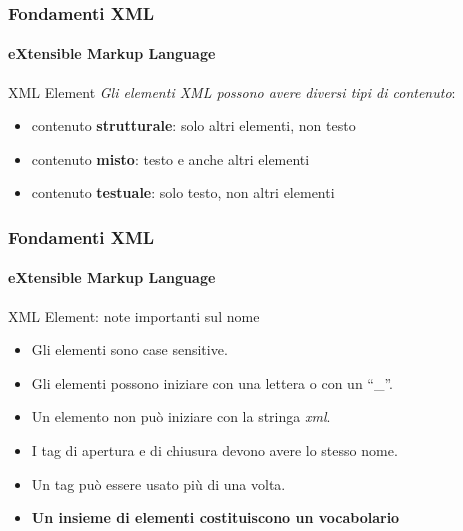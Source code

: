 \begin{frame}
    \frametitle{Fondamenti XML}
    \framesubtitle{eXtensible Markup Language}
    \addtocounter{nframe}{1}

	\begin{block}{XML Element}
		\textit{Gli elementi XML possono avere diversi tipi di contenuto}:
		\begin{itemize}
			\item contenuto \textbf{strutturale}: solo altri elementi, non testo
			\item contenuto \textbf{misto}: testo e anche altri elementi
			\item contenuto \textbf{testuale}: solo testo, non altri elementi
		\end{itemize}
	\end{block}
	
\end{frame}

\begin{frame}
    \frametitle{Fondamenti XML}
    \framesubtitle{eXtensible Markup Language}
    \addtocounter{nframe}{1}

	\begin{block}{XML Element: note importanti sul nome}
		\begin{itemize}
			\item Gli elementi sono case sensitive.
			\item Gli elementi possono iniziare con una lettera o con un ``\_''.
			\item Un elemento non può iniziare con la stringa \textit{xml}. 
			\item I tag di apertura e di chiusura devono avere lo stesso nome.
			\item Un tag può essere usato più di una volta.
			\item \textbf{Un insieme di elementi costituiscono un vocabolario}
		\end{itemize}
	\end{block}
\end{frame}





